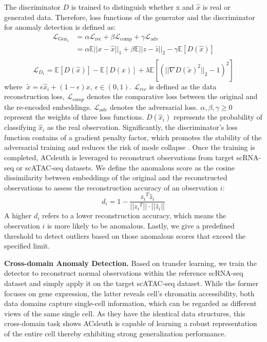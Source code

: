 \documentclass{article}
\begin{document}
The discriminator $D$ is trained to distinguish whether x and $\hat{x}$ is real or 
generated data. Therefore, loss functions of the generator and the discriminator for 
anomaly detection is defined as:
\begin{equation}
\begin{split}
    \mathcal{L}_{\text{Gen}_1} &= \alpha\mathcal{L}_{\text{rec}} + \beta\mathcal{L}_{\text{comp}} + \gamma\mathcal{L}_{\text{adv}} \\
    &= \alpha\mathbb{E}{||x - \widehat{x}||}_1 + \beta\mathbb{E}{||z - \widehat{z}||}_2 - \gamma\mathbb{E}[D(\widehat{x})] \\
\end{split}
\end{equation}
\begin{equation}
    \mathcal{L}_{D_1} = \mathbb{E}\left[D\left(\widehat{x}\right)\right] - \mathbb{E}\left[D\left(x\right)\right] + \lambda\mathbb{E}[{({||\nabla D (\widetilde{x})^2||}_2 - 1)}^2]  
\end{equation}
where $\ \widetilde{x}=\epsilon\widehat{x}_i+\left(1-\epsilon\right){x},\ \epsilon\in\left(0,1\right)$. 
$\mathcal{L}_{rec}$ 
is defined as the data reconstruction loss, $\mathcal{L}_{comp}$ denotes the comparative 
loss between the original and the re-encoded embeddings. $\mathcal{L}_{adv}$ denotes the 
adversarial loss. $\alpha, \beta, \gamma\geq0$ represent the weights of three loss functions. 
$D\left(\widehat{x}_i\right)$ represents the probability of classifying  $\widehat{x}_i$ as 
the real observation. Significantly, the discriminator’s loss function contains of a 
gradient penalty factor, which promotes the stability of the adversarial training and 
reduces the risk of mode collapse \cite{wGANs}.
Once the training is completed, ACsleuth is leveraged to reconstruct observations from target 
scRNA-seq or scATAC-seq datasets. We define the anomalous score as the cosine 
dissimilarity between embeddings of the original and the reconstructed observations to 
assess the reconstruction accuracy of an observation $i$:
\begin{equation}
    d_i = 1-\frac{{z_i}^T\widehat{z}_i}{||{z_i}^T||\cdot||\widehat{z}_i||}
\end{equation}
A higher $d_i$ refers to a lower reconstruction accuracy, which means the 
observation $i$ is more likely to be anomalous. Lastly, we give a predefined threshold to 
detect outliers based on those anomalous scores that exceed the specified limit.

\textbf{Cross-domain Anomaly Detection.}	Based on transfer learning, we train the 
detector to reconstruct normal observations within the reference scRNA-seq dataset 
and simply apply it on the target scATAC-seq dataset. While the former focuses on gene 
expression, the latter reveals cell’s chromatin accessibility, both data domains capture 
single-cell information, which can be regarded as different views of the same single cell. 
As they have the identical data structures, this cross-domain task shows ACsleuth is capable 
of learning a robust representation of the entire cell thereby exhibiting strong 
generalization performance.
\end{document}
